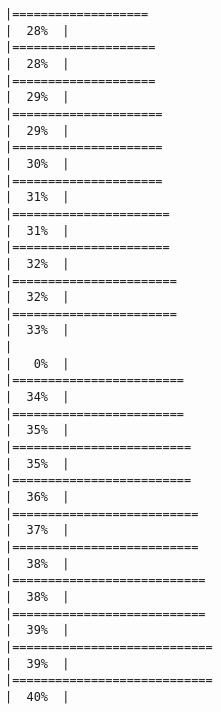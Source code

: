 \documentclass[
]{article}
\begin{document}
\begin{verbatim}
|===================                                                   |  28%  |                                                                              |====================                                                  |  28%  |                                                                              |====================                                                  |  29%  |                                                                              |=====================                                                 |  29%  |                                                                              |=====================                                                 |  30%  |                                                                              |=====================                                                 |  31%  |                                                                              |======================                                                |  31%  |                                                                              |======================                                                |  32%  |                                                                              |=======================                                               |  32%  |                                                                              |=======================                                               |  33%  |                                                                              |                                                                      |   0%  |                                                                              |========================                                              |  34%  |                                                                              |========================                                              |  35%  |                                                                              |=========================                                             |  35%  |                                                                              |=========================                                             |  36%  |                                                                              |==========================                                            |  37%  |                                                                              |==========================                                            |  38%  |                                                                              |===========================                                           |  38%  |                                                                              |===========================                                           |  39%  |                                                                              |============================                                          |  39%  |                                                                              |============================                                          |  40%  |                                                                              
\end{verbatim}
\end{document}
